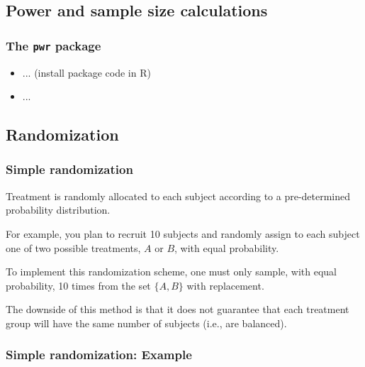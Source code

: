 \documentclass{beamer}
\begin{document}
\subsection{Power and sample size calculations}

\begin{frame}
    \frametitle{The \texttt{pwr} package}
    \begin{itemize}
      \item ... (install package code in R)
      \item ...
    \end{itemize}
\end{frame}


\subsection{Randomization}

\begin{frame}
    \frametitle{Simple randomization}
	Treatment is randomly allocated to each subject according to a pre-determined probability distribution.\\
	
	\bigskip
	
	For example, you plan to recruit 10 subjects and randomly assign to each subject 
	one of two possible treatments, $A$ or $B$, with equal probability.
	
	\bigskip
	
	To implement this randomization scheme, one must only sample, with equal probability,
	10 times from the set $\{A, B\}$ with replacement.
	
	\bigskip
	
	The downside of this method is that it does not guarantee that each treatment group will
	have the same number of subjects (i.e., are balanced).
\end{frame}


\begin{frame}[fragile]
    \frametitle{Simple randomization: Example}
	
\end{frame}
\end{document}
